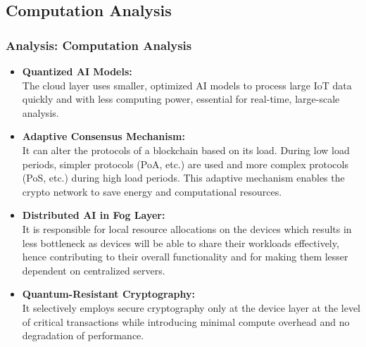 \documentclass [xcolor=svgnames] {beamer}
\begin{document}
\begin{frame}
\footnotesize
\subsection{Computation Analysis}
\frametitle{Analysis: Computation Analysis}

\begin{itemize}
\item \textbf{Quantized AI Models: }\\
The cloud layer uses smaller, optimized AI models to process large IoT data quickly and with less computing power, essential for real-time, large-scale analysis.

\item \textbf{Adaptive Consensus Mechanism: }\\
It can alter the protocols of a blockchain based on its load. During low load periods, simpler protocols (PoA, etc.) are used and more complex protocols (PoS, etc.) during high load periods. This adaptive mechanism enables the crypto network to save energy and computational resources.

\item \textbf{Distributed AI in Fog Layer: }\\
It is responsible for local resource allocations on the devices which results in less bottleneck as devices will be able to share their workloads effectively, hence contributing to their overall functionality and for making them lesser dependent on centralized servers.

\item \textbf{Quantum-Resistant Cryptography:}\\
It selectively employs secure cryptography only at the device layer at the level of critical transactions while introducing minimal compute overhead and no degradation of performance.


\end{itemize}

\end{frame}
\end{document}
